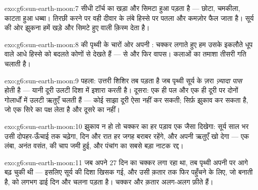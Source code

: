 \begin{solution}{exo:g6:sun-earth-moon:7}
सीधी टॉर्च का  खड़ा और सिमटा हुआ पड़ता है --- छोटा, चमकीला,
काटता हुआ धब्बा। तिरछी करने पर वही  दीवार के लंबे हिस्से पर
पतला और कमज़ोर फैल जाता है। सूर्य की ओर झुकना हमें खड़े और सिमटे हुए
 वाली क़िस्म देता है।
\end{solution}

\begin{solution}{exo:g6:sun-earth-moon:8}
 की पृथ्वी के चारों ओर अपनी : चक्कर लगाते हुए हम उसके
इकलौते धूप वाले आधे हिस्से को बदलते कोणों से देखते हैं ---  से
 और फिर वापस। कलाओं का तमाशा तीसरी गति चलाती है।
\end{solution}

\begin{solution}{exo:g6:sun-earth-moon:9}
पहला: उत्तरी शिशिर तब पड़ता है जब पृथ्वी सूर्य के ज़रा \emph{ज़्यादा
पास} होती है --- यानी दूरी उलटी दिशा में इशारा करती है। दूसरा: एक ही
पल और एक ही दूरी पर दोनों गोलार्धों में उलटी ऋतुएँ चलती हैं --- कोई
साझा दूरी ऐसा नहीं कर सकती; सिर्फ़ झुकाव कर सकता है, जो एक सिरे का
पक्ष लेता है और दूसरे का नहीं।
\end{solution}

\begin{solution}{exo:g6:sun-earth-moon:10}
झुकाव न हो तो चक्कर का हर पड़ाव एक जैसा दिखेगा: सूर्य साल भर उसी
दोपहर-ऊँचाई तक चढ़ेगा, दिन और रात हर जगह बराबर रहेंगे, और  अपनी
ऋतुएँ खो देगा --- एक लंबा, अनंत वसंत,  की चाप जमी हुई, और
पंचांग का सबसे बड़ा नाटक रद्द।
\end{solution}

\begin{solution}{exo:g6:sun-earth-moon:11}
 जब अपने $27$ दिन का चक्कर लगा रहा था, तब पृथ्वी अपनी  पर
आगे बढ़ चुकी थी --- इसलिए सूर्य की दिशा खिसक गई, और उसी क़तार तक फिर
पहुँचने के लिए, जो  बनाती है,  को लगभग ढाई दिन और
चलना पड़ता है। चक्कर और क़तार अलग-अलग फ़ीते हैं।
\end{solution}

